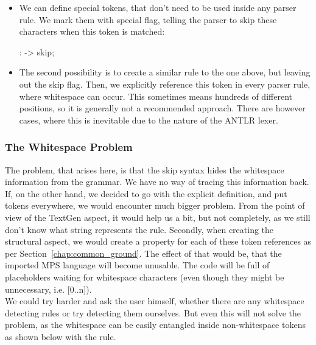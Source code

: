 \begin{itemize}
	\item We can define special tokens, that don't need to be used inside any parser rule.
	We mark them with special flag, telling the parser to skip these characters when this token is matched:

	\begin{antlr}
		   :     -> skip;
	\end{antlr}

	\item The second possibility is to create a similar rule to the one above, but leaving out the skip flag.
	Then, we explicitly reference this token in every parser rule, where whitespace can occur.
	This sometimes means hundreds of different positions, so it is generally not a recommended approach.
	There are however cases, where this is inevitable due to the nature of the ANTLR lexer.
\end{itemize}

\subsubsection{The Whitespace Problem}

The problem, that arises here, is that the skip syntax hides the whitespace information from the grammar.
We have no way of tracing this information back.
If, on the other hand, we decided to go with the explicit definition, and put  tokens everywhere, we would encounter much bigger problem.
From the point of view of the TextGen aspect, it would help us a bit, but not completely, as we still don't know what string represents the rule.
Secondly, when creating the structural aspect, we would create a property for each of these token references as per Section~\ref{chap:common_ground}.
The effect of that would be, that the imported MPS language will become unusable.
The code will be full of placeholders waiting for whitespace characters (even though they might be unnecessary, i.e. [0..n]).
\\

We could try harder and ask the user himself, whether there are any whitespace detecting rules or try detecting them ourselves.
But even this will not solve the problem, as the whitespace can be easily entangled inside non-whitespace tokens as shown below with the  rule.
\\

